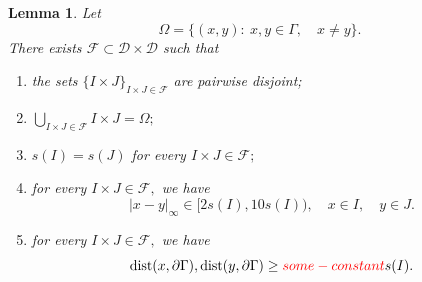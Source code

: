 \documentclass{amsart}
\newtheorem{lem}{Lemma}
\begin{document}
\begin{lem}\label{whitney lemma} 
Let
$$\Omega=\{(x,y):\ x,y\in\Gamma,\quad x\neq y\}.$$
	There exists $\mathcal{F}\subset\mathcal{D}\times\mathcal{D}$ such that
\begin{enumerate}[{\rm (i)}]
\item the sets $\{I\times J\}_{I\times J\in\mathcal{F}}$ are pairwise disjoint;
\item $\bigcup_{I\times J\in\mathcal{F}}I\times J=\Omega;$
\item $s(I)=s(J)$ for every $I\times J\in\mathcal{F};$
\item for every $I\times J\in\mathcal{F},$  we have
$$|x-y|_{\infty}\in [2s(I),10 s(I)),\quad x\in I,\quad y\in J.$$
\item for every $I\times J\in\mathcal{F},$ we have
$${\rm dist}(x,\partial\Gamma),{\rm dist}(y,\partial\Gamma)\geq {\color{red} some-constant}s(I).$$
\end{enumerate}
\end{lem}
\end{document}
